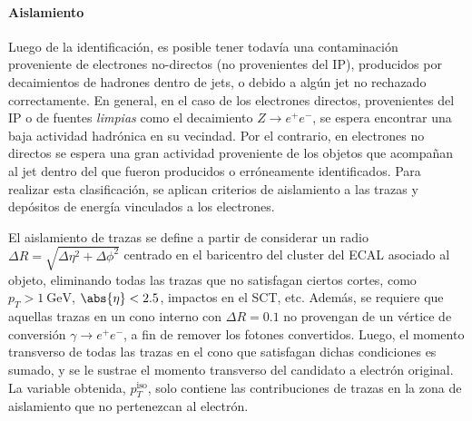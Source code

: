 \paragraph{Aislamiento}

Luego de la identificación, es posible tener todavía una contaminación proveniente de electrones no-directos (no provenientes del IP), producidos por decaimientos de hadrones dentro de jets, o debido a algún jet no rechazado correctamente. En general, en el caso de los electrones directos, provenientes del IP o de fuentes \textit{limpias} como el decaimiento $Z \to e^+ e^-$, se espera encontrar una baja actividad hadrónica en su vecindad. Por el contrario, en electrones no directos se espera una gran actividad proveniente de los objetos que acompañan al jet dentro del que fueron producidos o erróneamente identificados. Para realizar esta clasificación, se aplican criterios de aislamiento a las trazas y depósitos de energía vinculados a los electrones.

El aislamiento de trazas se define a partir de considerar un radio $\Delta R = \sqrt{\Delta\eta^2 + \Delta\phi^2}$ centrado en el baricentro del cluster del ECAL asociado al objeto, eliminando todas las trazas que no satisfagan ciertos cortes, como $p_T > \SI{1}{\GeV}$, $\abs{\eta} < 2.5$, impactos en el SCT, etc. Además, se requiere que aquellas trazas en un cono interno con $\Delta R = 0.1$ no provengan de un vértice de conversión $\gamma \to e^+ e^-$, a fin de remover los fotones convertidos. Luego, el momento transverso de todas las trazas en el cono que satisfagan dichas condiciones es sumado, y se le sustrae el momento transverso del candidato a electrón original. La variable obtenida, $p_T^{\text{iso}}$, solo contiene las contribuciones de trazas en la zona de aislamiento que no pertenezcan al electrón.

